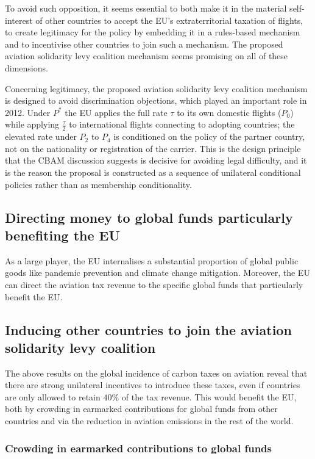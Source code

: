 To avoid such opposition, it seems essential to both make it in the material self-interest of other countries to accept the EU's extraterritorial taxation of flights, to create legitimacy for the policy by embedding it in a rules-based mechanism and to incentivise other countries to join such a mechanism. The proposed aviation solidarity levy coalition mechanism seems promising on all of these dimensions.

Concerning legitimacy, the proposed aviation solidarity levy coalition mechanism is designed to avoid discrimination objections, which played an important role in 2012. Under $P^*$ the EU applies the full rate $\tau$ to its own domestic flights ($P_0$) while applying $\frac{\tau}{2}$ to international flights connecting to adopting countries; the elevated rate under $P_2$ to $P_4$ is conditioned on the policy of the partner country, not on the nationality or registration of the carrier. This is the design principle that the CBAM discussion suggests is decisive for avoiding legal difficulty, and it is the reason the proposal is constructed as a sequence of unilateral conditional policies rather than as membership conditionality.

\subsection{Directing money to global funds particularly benefiting the EU}

As a large player, the EU internalises a substantial proportion of global public goods like pandemic prevention and climate change mitigation. Moreover, the EU can direct the aviation tax revenue to the specific global funds that particularly benefit the EU. 

\subsection{Inducing other countries to join the aviation solidarity levy coalition}

The above results on the global incidence of carbon taxes on aviation reveal that there are strong unilateral incentives to introduce these taxes, even if countries are only allowed to retain $40\%$ of the tax revenue. This would benefit the EU, both by crowding in earmarked contributions for global funds from other countries and via the reduction in aviation emissions in the rest of the world.

\subsubsection{Crowding in earmarked contributions to global funds}

